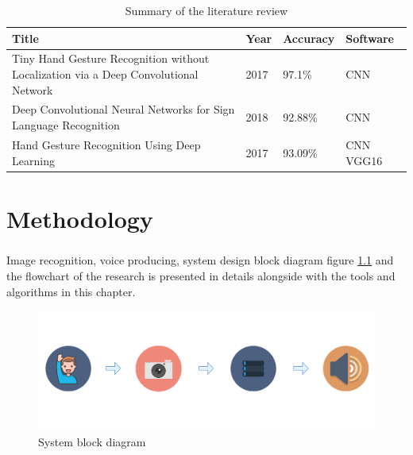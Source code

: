 \documentclass[12pt]{report}
\begin{document}
                    \begin{center}
                        \begin{table}[h]
                            \caption{Summary of the literature review}
                            \begin{tabular}{ |p{7cm}|p{2cm}|p{2cm}|p{3cm}| }
                                \hline
                                Title & Year & Accuracy & Software\\
                                \hline
                                Tiny Hand Gesture Recognition without Localization via a Deep Convolutional Network & 2017 & 97.1\%& CNN \\
                                \hline
                                Deep Convolutional Neural Networks for Sign Language Recognition & 2018 & 92.88\% & CNN \\
                                \hline
                                Hand Gesture Recognition Using Deep Learning & 2017 & 93.09\% & CNN VGG16 \\
                                \hline
                            \end{tabular}
                            \label{table:summary}
                        \end{table}
                    \end{center}
        \newpage

    \chapter{Methodology}
        \paragraph{}
            Image recognition, voice producing, system design block diagram figure \ref{fig:system_diagram} 
            and the flowchart of the research is presented in details alongside with the tools
            and algorithms in this chapter.
            
            \begin{figure}[h]
                \centering
                \includegraphics[width=\textwidth]{./images/system_diagram.png}
                \caption{System block diagram}
                \label{fig:system_diagram}
            \end{figure}
        
\end{document}
